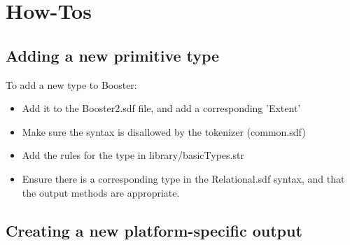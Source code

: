\chapter{How-Tos}

\section{Adding a new primitive type}

To add a new type to Booster:
\begin{itemize}
\item Add it to the Booster2.sdf file, and add a corresponding 'Extent' 
\item Make sure the syntax is disallowed by the tokenizer (common.sdf)
\item Add the rules for the type in library/basicTypes.str
\item Ensure there is a corresponding type in the Relational.sdf
  syntax, and that the output methods are appropriate.
\end{itemize}

\section{Creating a new platform-specific output}
